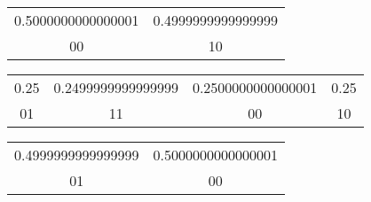 \begin{tabular}{|c|c|}
\hline
0.5000000000000001 & 0.4999999999999999 \\ 
00 & 10 \\ 
\hline
\end{tabular}

\begin{tabular}{|c|c|c|c|}
\hline
0.25 & 0.2499999999999999 & 0.2500000000000001 & 0.25 \\ 
01 & 11 & 00 & 10 \\ 
\hline
\end{tabular}

\begin{tabular}{|c|c|}
\hline
0.4999999999999999 & 0.5000000000000001 \\ 
01 & 00 \\ 
\hline
\end{tabular}

